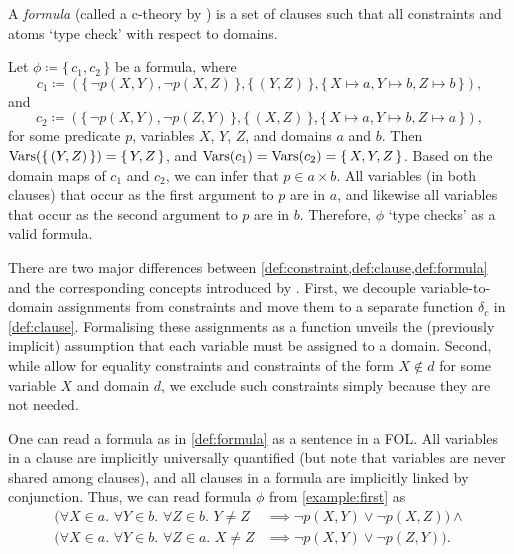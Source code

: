 \begin{definition}[Formula]\label{def:formula}
  A \emph{formula} (called a c-theory by \citet{DBLP:conf/ijcai/BroeckTMDR11})
  is a set of clauses such that all constraints and atoms `type check' with
  respect to domains.
\end{definition}

\begin{example}\label{example:first}
  Let $\phi \coloneqq \{\, c_1, c_2 \,\}$ be a formula, where
  \[
    c_1 \coloneqq (\{\, \neg p(X, Y), \neg p(X, Z) \,\}, \{\, (Y, Z) \,\}, \{\, X \mapsto a, Y \mapsto b, Z \mapsto b \,\}),
  \]
  and
  \[
    c_2 \coloneqq (\{\, \neg p(X, Y), \neg p(Z, Y) \,\}, \{\, (X, Z) \,\}, \{\, X \mapsto a, Y \mapsto b, Z \mapsto a \,\}),
  \]
  for some predicate $p$, variables $X$, $Y$, $Z$, and domains $a$ and $b$. Then
  $\operatorname{Vars}(\{\, (Y, Z) \,\}) = \{\, Y, Z \,\}$, and
  $\operatorname{Vars}(c_{1}) = \operatorname{Vars}(c_{2}) = \{\, X, Y, Z \,\}$. Based on the domain maps of
  $c_{1}$ and $c_{2}$, we can infer that $p \in a \times b$. All variables (in
  both clauses) that occur as the first argument to $p$ are in $a$, and likewise
  all variables that occur as the second argument to $p$ are in $b$. Therefore,
  $\phi$ `type checks' as a valid formula.
\end{example}

There are two major differences between
\cref{def:constraint,def:clause,def:formula} and the corresponding concepts
introduced by \citet{DBLP:conf/ijcai/BroeckTMDR11}. First, we decouple
variable-to-domain assignments from constraints and move them to a separate
function $\delta_{c}$ in \cref{def:clause}. Formalising these assignments as a
function unveils the (previously implicit) assumption that each variable must be
assigned to a domain. Second, while \citet{DBLP:conf/ijcai/BroeckTMDR11} allow
for equality constraints and constraints of the form $X \not\in d$ for some
variable $X$ and domain $d$, we exclude such constraints simply because they are
not needed.

One can read a formula as in \cref{def:formula} as a sentence in a FOL\@.
All variables in a
clause are implicitly universally quantified (but note that variables are never
shared among clauses), and all clauses in a formula are implicitly linked by
conjunction. Thus, we can read formula $\phi$ from \cref{example:first} as
\begin{align*}
  (\forall X \in a\text{. }\forall Y \in b\text{. }\forall Z \in b\text{. }Y \ne Z &\implies \neg p(X, Y) \lor \neg p(X, Z)) \land \\
  (\forall X \in a\text{. }\forall Y \in b\text{. }\forall Z \in a\text{. }X \ne Z &\implies \neg p(X, Y) \lor \neg p(Z, Y)).
\end{align*}


